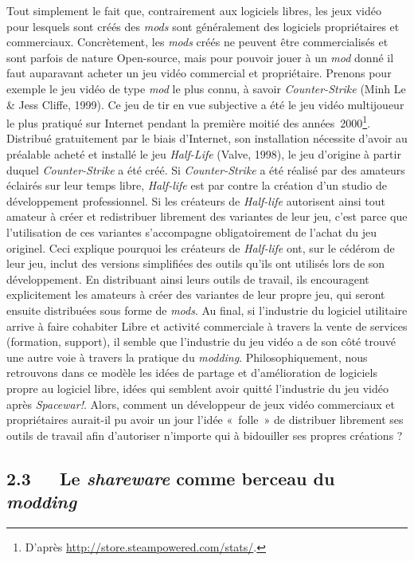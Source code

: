 \documentclass{FramateX}
\begin{document}
\begin{refsection}
Tout simplement le fait que, contrairement aux logiciels libres, les
jeux vidéo pour lesquels sont créés des \textit{mods} sont généralement des logiciels
propriétaires et commerciaux. Concrètement, les
 \textit{mods} créés ne peuvent être
commercialisés et sont parfois de nature Open-source, mais pour pouvoir
jouer à un \textit{mod} donné il faut
auparavant acheter un jeu vidéo commercial et propriétaire. Prenons
pour exemple le jeu vidéo de type \textit{mod} le plus connu, à savoir \textit{Counter-Strike} (Minh Le \& Jess Cliffe, 1999). Ce jeu de tir en vue subjective a été le jeu vidéo
multijoueur le plus pratiqué sur Internet pendant la première moitié
des années~2000\footnote{D'après
\url{http://store.steampowered.com/stats/}.}.
Distribué gratuitement par le biais d'Internet, son installation
nécessite d'avoir au préalable acheté et installé le jeu \textit{Half-Life} (Valve, 1998), le jeu d'origine à partir duquel \textit{Counter-Strike} a été créé. Si \textit{Counter-Strike} a été réalisé par des
amateurs éclairés sur leur temps libre, \textit{Half-life} est par contre la création
d'un studio de développement professionnel. Si les créateurs de \textit{Half-life} autorisent ainsi tout amateur à créer et redistribuer librement des variantes de leur jeu,
c'est parce que l'utilisation de ces variantes s'accompagne
obligatoirement de l'achat du jeu originel. Ceci explique pourquoi les
créateurs de \textit{Half-life} ont, sur le
cédérom de leur jeu, inclut des versions simplifiées des outils qu'ils
ont utilisés lors de son développement. En distribuant ainsi leurs
outils de travail, ils encouragent explicitement les amateurs à créer
des variantes de leur propre jeu, qui seront ensuite distribuées sous
forme de \textit{mods}. Au final, si
l'industrie du logiciel utilitaire arrive à faire cohabiter Libre et
activité commerciale à travers la vente de services (formation, support), il semble que
l'industrie du jeu vidéo a de son côté trouvé une autre voie à travers
la pratique du \textit{modding}.
Philosophiquement, nous retrouvons dans ce modèle les idées de partage
et d'amélioration de logiciels propre au logiciel libre, idées qui
semblent avoir quitté l'industrie du jeu vidéo après \textit{Spacewar!}. Alors, comment un
développeur de jeux vidéo commerciaux et propriétaires aurait-il pu
avoir un jour l'idée «~folle~» de distribuer librement ses outils de
travail afin d'autoriser n'importe qui à bidouiller ses propres
créations ?

\subsection*{2.3~~~Le \textit{shareware} comme berceau du \textit{modding}}
{}


\end{refsection}
\end{document}
